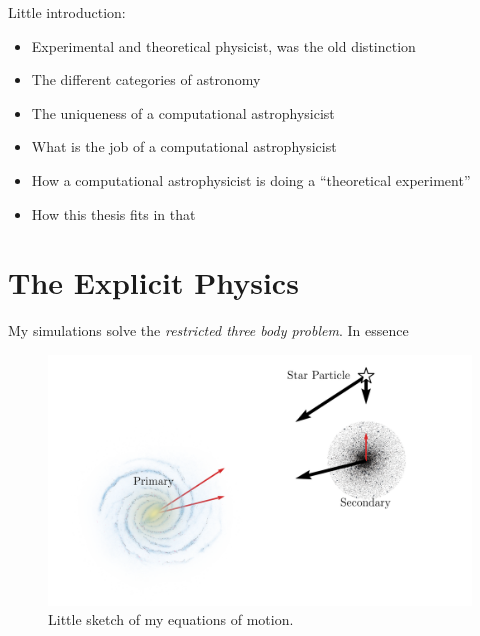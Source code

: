 Little introduction: 
\begin{itemize}
    \item Experimental and theoretical physicist, was the old distinction
    \item The different categories of astronomy
    \item The uniqueness of a computational astrophysicist
    \item What is the job of a computational astrophysicist
    \item How a computational astrophysicist is doing a “theoretical experiment”
    \item How this thesis fits in that 
\end{itemize}


\section{The Explicit Physics}
    My simulations solve the \textit{restricted three body problem}. In essence
    \begin{figure}
        \centering
        \includegraphics[width=\linewidth]{images/restricted_three_body_set_up.png}
        \caption{Little sketch of my equations of motion. }
    \end{figure}
    

